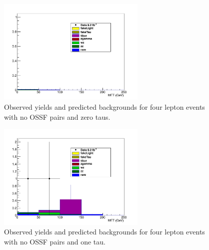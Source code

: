 \begin{figure}[htp]
\begin{center}
\includegraphics[width=0.63\textwidth]{plots/4L_MET_dist_offZ_ossf0_tau0_note.pdf}
\caption{Observed yields and predicted backgrounds for four lepton events with no OSSF pairs and zero taus.}
\label{fig:L4OSSF0tau0}
\end{center}
\end{figure}
\begin{figure}[htp]
\begin{center}
\includegraphics[width=0.63\textwidth]{plots/4L_MET_dist_offZ_ossf0_tau1_note.pdf}
\caption{Observed yields and predicted backgrounds for four lepton events with no OSSF pairs and one tau.}
\label{fig:L4OSSF0tau1}
\end{center}
\end{figure}
